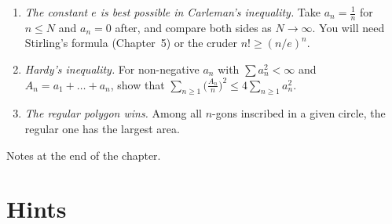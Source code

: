 \begin{challenge}
\begin{enumerate}[label=(\arabic*)]
\item \emph{The constant $e$ is best possible in Carleman's inequality.} Take $a_n=\frac1n$ for $n\le N$ and $a_n=0$ after, and compare both sides as $N\to\infty$. You will need Stirling's formula (Chapter~5) or the cruder $n!\ge(n/e)^n$.
\item \emph{Hardy's inequality.} For non-negative $a_n$ with $\sum a_n^2<\infty$ and $A_n=a_1+\dots+a_n$, show that $\sum_{n\ge1}\bigl(\frac{A_n}n\bigr)^2\le4\sum_{n\ge1}a_n^2$.
\item \emph{The regular polygon wins.} Among all $n$-gons inscribed in a given circle, the regular one has the largest area.
\end{enumerate}
Notes at the end of the chapter.
\end{challenge}

\section{Hints}

